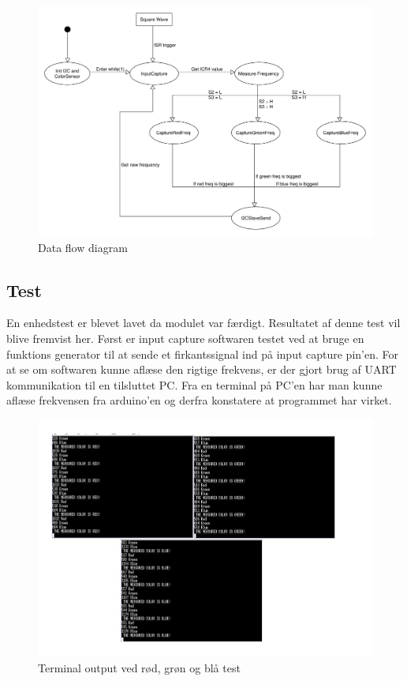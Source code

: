 \begin{figure}[H]
	\centering
	\includegraphics[width = 500pt]{Img/DataFlowDiagram.pdf}
	\caption{Data flow diagram}
	\label{fig:DataFlow}
\end{figure}


\subsection{Test}
En enhedstest er blevet lavet da modulet var færdigt. Resultatet af denne test vil blive fremvist her. Først er input capture softwaren testet ved at bruge en funktions generator til at sende et firkantssignal ind på input capture pin'en. For at se om softwaren kunne aflæse den rigtige frekvens, er der gjort brug af UART kommunikation til en tilsluttet PC. Fra en terminal på PC'en har man kunne aflæse frekvensen fra arduino'en og derfra konstatere at programmet har virket.

\begin{figure}[H]
	\centering
	\includegraphics[width = 450pt]{Img/Test_all.pdf}
	\caption{Terminal output ved rød, grøn og blå test}
	\label{fig:Test_all}
\end{figure}

